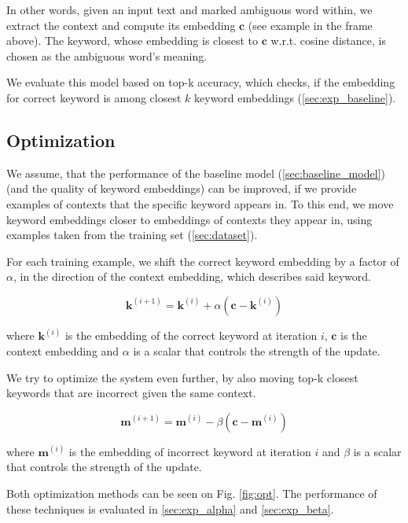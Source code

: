 \documentclass{llncs}
\begin{document}
In other words, given an input text and marked ambiguous word within, we extract the context and compute its embedding \(\bm{c}\) (see example in the frame above). The keyword, whose embedding is closest to \(\bm{c}\) w.r.t. cosine distance, is chosen as the ambiguous word's meaning.

We evaluate this model based on top-k accuracy, which checks, if the embedding for correct keyword is among closest \(k\) keyword embeddings (\ref{sec:exp_baseline}).


\subsection{Optimization}
\label{sec:optimization}
We assume, that the performance of the baseline model (\ref{sec:baseline_model}) (and the quality of keyword embeddings) can be improved, if we provide examples of contexts that the specific keyword appears in. To this end, we move keyword embeddings closer to embeddings of contexts they appear in, using examples taken from the training set (\ref{sec:dataset}).

For each training example, we shift the correct keyword embedding by a factor of \(\alpha\), in the direction of the context embedding, which describes said keyword.

\begin{equation}
    \label{eq:alpha_optimization}
    \bm{k}^{(i+1)} = \bm{k}^{(i)} + \alpha(\bm{c} - \bm{k}^{(i)})
\end{equation}

where \(\bm{k}^{(i)}\) is the embedding of the correct keyword at iteration \(i\), \(\bm{c}\) is the context embedding and \(\alpha\) is a scalar that controls the strength of the update.

\smallskip
We try to optimize the system even further, by also moving top-k closest keywords that are incorrect given the same context.

\begin{equation}
    \label{eq:beta_optimization}
    \bm{m}^{(i+1)} = \bm{m}^{(i)} - \beta(\bm{c} - \bm{m}^{(i)})
\end{equation}

where \(\bm{m}^{(i)}\) is the embedding of incorrect keyword at iteration \(i\) and \(\beta\) is a scalar that controls the strength of the update.

Both optimization methods can be seen on Fig. \ref{fig:opt}. The performance of these techniques is evaluated in \ref{sec:exp_alpha} and \ref{sec:exp_beta}.
\end{document}

